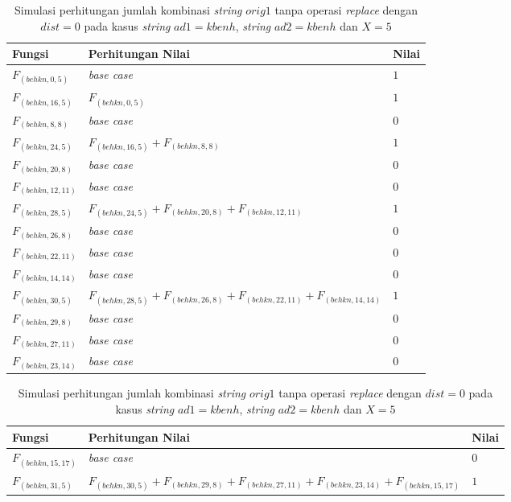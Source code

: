 \begin{appendices}
  
  \begin{table}[H]
  	\centering
  	\begin{tabular} {|p{3cm}|p{5cm}|p{1cm}|} \hline
  		Fungsi & Perhitungan Nilai & Nilai \\ \hline
  		$ F_{(behkn, 0, 5)} $ & \textit{base case} & $ 1 $ \\ \hline
  		$ F_{(behkn, 16, 5)}  $ & $F_{(behkn, 0, 5)}$ & $ 1 $ \\ \hline
  		$ F_{(behkn, 8, 8)} $ & \textit{base case} & $ 0 $ \\ \hline
  		$ F_{(behkn, 24, 5)}  $ & $F_{(behkn, 16, 5)} + F_{(behkn, 8, 8)}$ & $ 1 $ \\ \hline
  		$ F_{(behkn, 20, 8)} $ & \textit{base case} & $ 0 $ \\ \hline
  		$ F_{(behkn, 12, 11)} $ & \textit{base case} & $ 0 $ \\ \hline
  		$ F_{(behkn, 28, 5)}  $ & $F_{(behkn, 24, 5)} + F_{(behkn, 20, 8)} + F_{(behkn, 12, 11)}$ & $ 1 $ \\ \hline
  		$ F_{(behkn, 26, 8)} $ & \textit{base case} & $ 0 $ \\ \hline
  		$ F_{(behkn, 22, 11)} $ & \textit{base case} & $ 0 $ \\ \hline
  		$ F_{(behkn, 14, 14)} $ & \textit{base case} & $ 0 $ \\ \hline
  		$ F_{(behkn, 30, 5)}  $ & $F_{(behkn, 28, 5)} + F_{(behkn, 26, 8)} + F_{(behkn, 22, 11)} + F_{(behkn, 14, 14)}$ & $ 1 $ \\ \hline
  		$ F_{(behkn, 29, 8)} $ & \textit{base case} & $ 0 $ \\ \hline
  		$ F_{(behkn, 27, 11)} $ & \textit{base case} & $ 0 $ \\ \hline
  		$ F_{(behkn, 23, 14)} $ & \textit{base case} & $ 0 $ \\ \hline
  	\end{tabular}\caption{Simulasi perhitungan jumlah kombinasi \textit{string} $ orig1 $ tanpa operasi \textit{replace} dengan $ dist= 0  $ pada kasus \textit{string} $ ad1=kbenh $, \textit{string} $ ad2=kbenh $ dan $ X=5 $}
  	\label{tab:f_3_orig1_0_1}
  \end{table}
  
  \begin{table}[H]
  	\centering
  	\begin{tabular} {|p{3cm}|p{5cm}|p{1cm}|} \hline
  		Fungsi & Perhitungan Nilai & Nilai \\ \hline  		
  		$ F_{(behkn, 15, 17)} $ & \textit{base case} & $ 0 $ \\ \hline
  		\rowcolor{LightCyan}
  		$ F_{(behkn, 31, 5)}  $ & $F_{(behkn, 30, 5)} + F_{(behkn, 29, 8)} + F_{(behkn, 27, 11)} + F_{(behkn, 23, 14)} + F_{(behkn, 15, 17)}$ & $ 1 $ \\ \hline
  	\end{tabular}\caption{Simulasi perhitungan jumlah kombinasi \textit{string} $ orig1 $ tanpa operasi \textit{replace} dengan $ dist= 0  $ pada kasus \textit{string} $ ad1=kbenh $, \textit{string} $ ad2=kbenh $ dan $ X=5 $}
  	\label{tab:f_3_orig1_0_2}
  \end{table}
  

\end{appendices}
